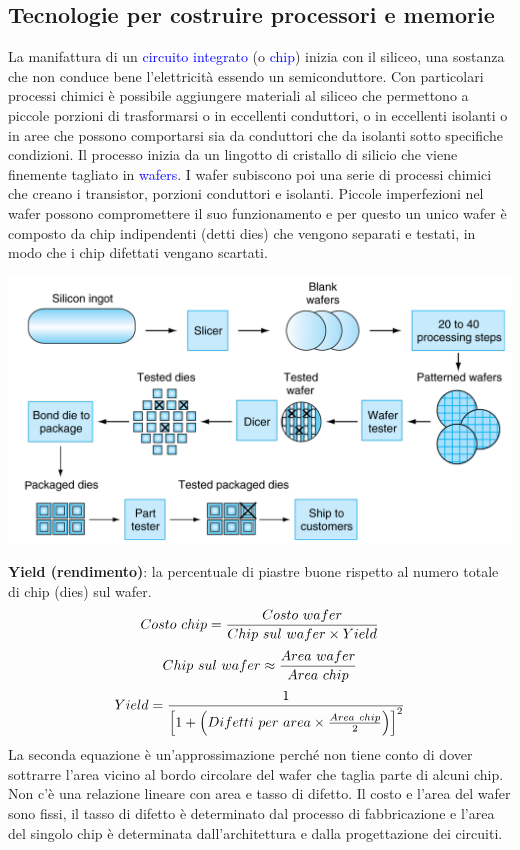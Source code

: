 \documentclass[12pt,a4paper]{article}
\begin{document}
\subsection{Tecnologie per costruire processori e memorie}
La manifattura di un \textcolor{blue}{circuito integrato} (o \textcolor{blue}{chip}) inizia con il siliceo, una sostanza che non conduce bene l'elettricità essendo un semiconduttore. Con particolari processi chimici è possibile aggiungere materiali al siliceo che permettono a piccole porzioni di trasformarsi o in eccellenti conduttori, o in eccellenti isolanti o in aree che possono comportarsi sia da conduttori che da isolanti sotto specifiche condizioni. Il processo inizia da un lingotto di cristallo di silicio che viene finemente tagliato in \textcolor{blue}{wafers}. I wafer subiscono poi una serie di processi chimici che creano i transistor, porzioni conduttori e isolanti. Piccole imperfezioni nel wafer possono compromettere il suo funzionamento e per questo un unico wafer è composto da chip indipendenti (detti dies) che vengono separati e testati, in modo che i chip difettati vengano scartati.
\begin{center}
\includegraphics[width=0.7\columnwidth]{img/processor_building.png}
\end{center}
\textbf{Yield (rendimento)}: la percentuale di piastre buone rispetto al numero totale di chip (dies) sul wafer.
$$Costo\ chip = {Costo\ wafer \over Chip\ sul \ wafer \times Yield}$$
$$Chip\ sul\ wafer \approx {Area\ wafer \over Area\ chip}$$
$$Yield = {1\over \left[1+\left(Difetti\ per\ area \times {Area\ chip \over 2}\right)\right]^2}$$
La seconda equazione è un'approssimazione perché non tiene conto di dover sottrarre l'area vicino al bordo circolare del wafer che taglia parte di alcuni chip.
Non c'è una relazione lineare con area e tasso di difetto. Il costo e l'area del wafer sono fissi, il tasso di difetto è determinato dal processo di fabbricazione e l'area del singolo chip è determinata dall'architettura e dalla progettazione dei circuiti.
\end{document}
